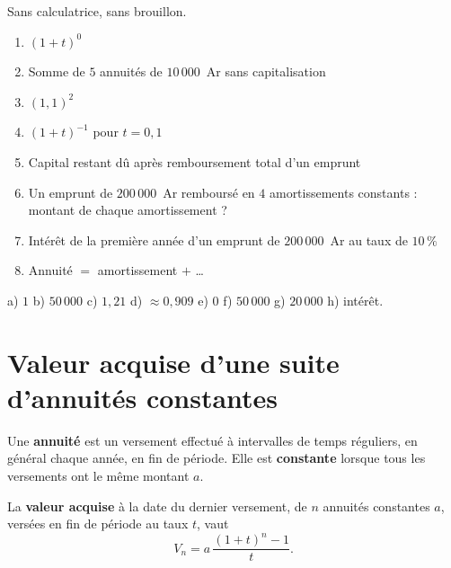 \begin{automatismes}
Sans calculatrice, sans brouillon.

\begin{enumerate}[label=\textbf{\alph*)}, leftmargin=*, itemsep=0.25em]
  \item $(1+t)^{0}$
  \item Somme de $5$ annuités de $10\,000$~Ar sans capitalisation
  \item $(1{,}1)^{2}$
  \item $(1+t)^{-1}$ pour $t = 0{,}1$
  \item Capital restant dû après remboursement total d'un emprunt
  \item Un emprunt de $200\,000$~Ar remboursé en $4$ amortissements
        constants : montant de chaque amortissement ?
  \item Intérêt de la première année d'un emprunt de $200\,000$~Ar au taux
        de $10\,\%$
  \item Annuité $=$ amortissement $+$ \dots
\end{enumerate}
\end{automatismes}

\begin{corrige}[automatismes]
a) $1$ \quad b) $50\,000$ \quad c) $1{,}21$ \quad d) $\approx 0{,}909$
\quad e) $0$ \quad f) $50\,000$ \quad g) $20\,000$ \quad h) intérêt.
\end{corrige}

\section{Valeur acquise d'une suite d'annuités constantes}

\begin{definition}
Une \textbf{annuité} est un versement effectué à intervalles de temps
réguliers, en général chaque année, en fin de période. Elle est
\textbf{constante} lorsque tous les versements ont le même montant $a$.
\end{definition}

\begin{theoreme}
La \textbf{valeur acquise} à la date du dernier versement, de $n$ annuités
constantes $a$, versées en fin de période au taux $t$, vaut
\[
  V_{n} = a\,\frac{(1+t)^{n}-1}{t} .
\]
\end{theoreme}

